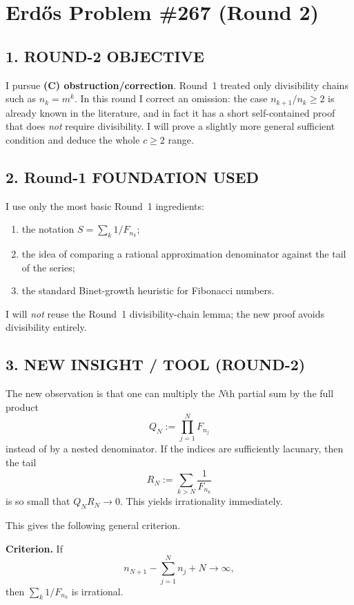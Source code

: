 \section*{Erd\H{o}s Problem \#267 (Round 2)}

\subsection*{1. ROUND-2 OBJECTIVE}

I pursue \textbf{(C) obstruction/correction}.  Round~1 treated only divisibility chains such as $n_k=m^k$.  In this round I correct an omission: the case $n_{k+1}/n_k\ge 2$ is already known in the literature, and in fact it has a short self-contained proof that does \emph{not} require divisibility.  I will prove a slightly more general sufficient condition and deduce the whole $c\ge 2$ range.

\subsection*{2. Round-1 FOUNDATION USED}

I use only the most basic Round~1 ingredients:

\begin{enumerate}
\item the notation $S=\sum_k 1/F_{n_k}$;
\item the idea of comparing a rational approximation denominator against the tail of the series;
\item the standard Binet-growth heuristic for Fibonacci numbers.
\end{enumerate}

I will \emph{not} reuse the Round~1 divisibility-chain lemma; the new proof avoids divisibility entirely.

\subsection*{3. NEW INSIGHT / TOOL (ROUND-2)}

The new observation is that one can multiply the $N$th partial sum by the full product
\[
Q_N:=\prod_{j=1}^{N}F_{n_j}
\]
instead of by a nested denominator.  If the indices are sufficiently lacunary, then the tail
\[
R_N:=\sum_{k>N}\frac1{F_{n_k}}
\]
is so small that $Q_N R_N\to 0$.  This yields irrationality immediately.

This gives the following general criterion.

\medskip
\noindent
\textbf{Criterion.}
If
\[
 n_{N+1}-\sum_{j=1}^{N} n_j + N \to \infty,
\]
then $\sum_k 1/F_{n_k}$ is irrational.


